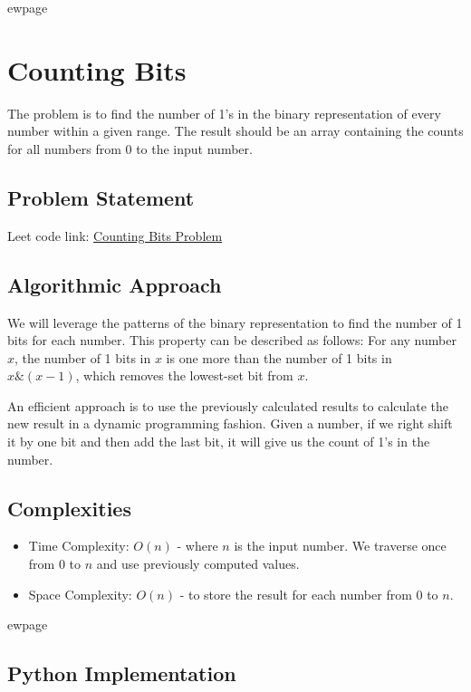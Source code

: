 
ewpage
\chapter{Counting Bits}
\label{chap:counting_bits}

The problem is to find the number of 1's in the binary representation of every number within a given range. The result should be an array containing the counts for all numbers from 0 to the input number.

\section*{Problem Statement}

Leet code link: \href{https://leetcode.com/problems/counting-bits/}{Counting Bits Problem}

\section*{Algorithmic Approach}

We will leverage the patterns of the binary representation to find the number of 1 bits for each number. This property can be described as follows: For any number \( x \), the number of 1 bits in \( x \) is one more than the number of 1 bits in \( x \& (x-1) \), which removes the lowest-set bit from \( x \).


An efficient approach is to use the previously calculated results to calculate the new result in a dynamic programming fashion. Given a number, if we right shift it by one bit and then add the last bit, it will give us the count of 1's in the number. 

\section*{Complexities}
\begin{itemize}
	\item Time Complexity: \(O(n)\) - where \(n\) is the input number. We traverse once from 0 to \(n\) and use previously computed values.
	\item Space Complexity: \(O(n)\) - to store the result for each number from 0 to \(n\).
\end{itemize}


ewpage 
\section*{Python Implementation}

